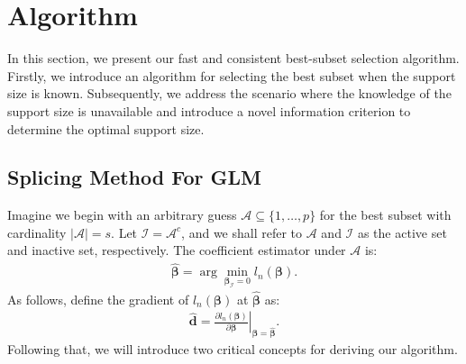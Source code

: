 \section{Algorithm}\label{sec:methodology}
In this section, we present our fast and consistent best-subset selection algorithm. Firstly, we introduce an algorithm for selecting the best subset when the support size is known. Subsequently, we address the scenario where the knowledge of the support size is unavailable and introduce a novel information criterion to determine the optimal support size.

\subsection{Splicing Method For GLM}
Imagine we begin with an arbitrary guess $\mathcal{A} \subseteq \{1, \ldots,p\}$ for the best subset with cardinality $|\mathcal{A}|=s$.
Let $\mathcal{I} = \mathcal{A}^c$, and we shall refer to $\mathcal{A}$ and $\mathcal{I}$ as the active set and inactive set, respectively.
The coefficient estimator under $\mathcal{A}$ is:
\begin{align*}\label{eqn:optimal_beta}
\hat{\bm \beta}=\arg\min_{\boldsymbol \beta_{\mathcal{I}}=0} l_n(\boldsymbol \beta).
\end{align*}
As follows, define the gradient of $l_n({\boldsymbol \beta})$ at $\hat{\bm \beta}$ as:
\begin{align*}
\hat{\boldsymbol d}
= \left.\frac{\partial l_n( \boldsymbol \beta )}{\partial \boldsymbol \beta}\right|_{\boldsymbol \beta = \hat{\boldsymbol \beta}}.
\end{align*}
Following that, we will introduce two critical concepts for deriving our algorithm.
